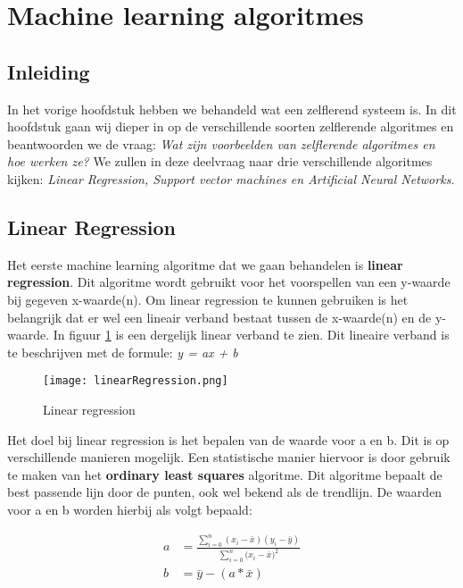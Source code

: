 \section{Machine learning algoritmes}
\label{chapter:MLA}

\subsection{Inleiding}
In het vorige hoofdstuk hebben we behandeld wat een zelflerend systeem is. In dit hoofdstuk gaan wij dieper in op de verschillende soorten zelflerende algoritmes en beantwoorden we de vraag: \textit{Wat zijn voorbeelden van zelflerende algoritmes en hoe werken ze?} We zullen in deze deelvraag naar drie verschillende algoritmes kijken: \textit{Linear Regression, Support vector machines en Artificial Neural Networks.} \cite{SunilRay} 

\subsection{Linear Regression}
Het eerste machine learning algoritme dat we gaan behandelen is \textbf{linear regression}. Dit algoritme wordt gebruikt voor het voorspellen van een y-waarde bij gegeven x-waarde(n). Om linear regression te kunnen gebruiken is het belangrijk dat er wel een lineair verband bestaat tussen de x-waarde(n) en de y-waarde. In figuur \ref{fig:LinearRegression1} is een dergelijk linear verband te zien. 
Dit lineaire verband is te beschrijven met de formule:
\textit{y = ax + b}

\begin{figure}[h]
  \centering
    \texttt{[image: linearRegression.png]}
  \caption{Linear regression}
  \label{fig:LinearRegression1}
\end{figure}

Het doel bij linear regression is het bepalen van de waarde voor a en b. Dit is op verschillende manieren mogelijk. Een statistische manier hiervoor is door gebruik te maken van het \textbf{ordinary least squares} algoritme. Dit algoritme bepaalt de best passende lijn door de punten, ook wel bekend als de trendlijn. De waarden voor a en b worden hierbij als volgt bepaald:

\begin{align*}
	a&=\frac{\sum_{i=0}^{n}(x_{i}-\bar{x})(y_{i}-\bar{y})}{\sum_{i=0}^{n}{(x_{i}-\bar{x}})^{2}}\\
	b&=\bar{y}-(a * \bar{x})
\end{align*}

